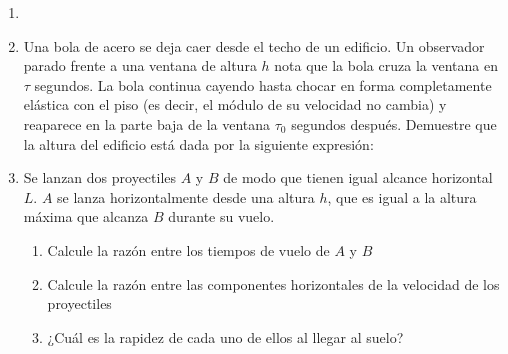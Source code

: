 \documentclass[letterpaper,11pt]{article}
\begin{document}
\vspace{-1cm}
\begin{enumerate}\setlength{\itemsep}{0.4cm}


\item[]


\item 
{
    \begin{multicols}{2}
        Una bola de acero se deja caer desde el techo de un edificio. Un observador parado frente a una ventana de altura $h$ nota que la bola cruza la ventana en $\tau$ segundos. La bola continua cayendo hasta chocar en forma completamente elástica con el piso (es decir, el módulo de su velocidad no cambia) y reaparece en la parte baja de la ventana $\tau_0$ segundos después. Demuestre que la altura del edificio está dada por la siguiente expresión:
        
        
        \columnbreak
        
        \begin{figure}[H]
            \centering
            
        \end{figure}
        
    \end{multicols}
}

\item Se lanzan dos proyectiles $A$ y $B$ de modo que tienen igual alcance horizontal $L$. $A$ se lanza horizontalmente desde una altura $h$, que es igual a la altura máxima que alcanza $B$ durante su vuelo.
{
    \begin{multicols}{2}
        \begin{enumerate}
            \item Calcule la razón entre los tiempos de vuelo de $A$ y $B$
            \item Calcule la razón entre las componentes horizontales de la velocidad de los proyectiles
            \item ¿Cuál es la rapidez de cada uno de ellos al llegar al suelo?
        \end{enumerate}
        

\end{multicols}}
\end{enumerate}
\end{document}
